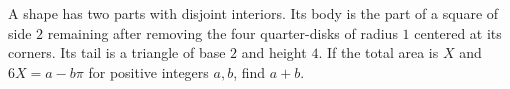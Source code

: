 A shape has two parts with disjoint interiors. Its body is the part of a square of side $2$ remaining after removing the four quarter-disks of radius $1$ centered at its corners. Its tail is a triangle of base $2$ and height $4$. If the total area is $X$ and $6X=a-b\pi$ for positive integers $a,b$, find $a+b$.
